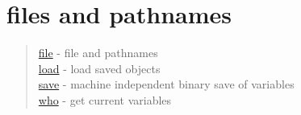\chapter*{files and pathnames}

\begin{quote}
\noindent
\hyperlink{file}{file} - file and pathnames\\
\hyperlink{load}{load} - load saved objects\\
\hyperlink{save}{save} - machine independent binary save of variables\\
\hyperlink{who}{who} - get current variables\\
\end{quote}

 
 
 
 

